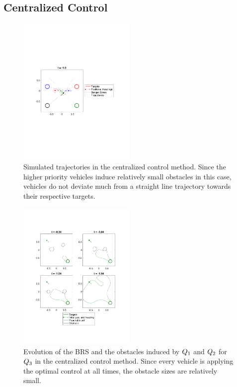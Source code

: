 \subsection{Centralized Control}
\begin{figure}[H]
  \centering
  \includegraphics[width=0.50\textwidth]{"fig/cc_traj"}
  \caption{Simulated trajectories in the centralized control method. Since the higher priority vehicles induce relatively small obstacles in this case, vehicles do not deviate much from a straight line trajectory towards their respective targets.}
  \label{fig:cc_traj}
\end{figure}

\begin{figure}[H]
  \centering
  \includegraphics[width=0.50\textwidth]{"fig/cc_rs3"}
  \caption{Evolution of the BRS and the obstacles induced by $Q_1$ and $Q_2$ for $Q_3$ in the centralized control method. Since every vehicle is applying the optimal control at all times, the obstacle sizes are relatively small.}
  \label{fig:cc_rs3}
\end{figure}

